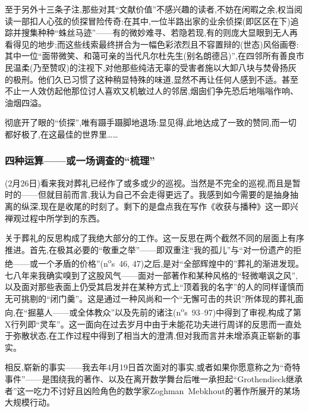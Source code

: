 至于另外十三条子注,那些对其“文献价值”不感兴趣的读者,不妨在闲暇之余,权当阅读一部扣人心弦的侦探冒险传奇:在其中,一位半路出家的业余侦探(即区区在下)追踪并搜集种种“蛛丝马迹”——有的微妙难寻、若隐若现,有的则庞大显眼到无人再看得见的地步;而这些线索最终拼合为一幅色彩浓烈且不容置辩的(世态)风俗画卷:其中一位“面带微笑、和蔼可亲的当代凡尔杜先生(别名朗德吕)”\dmark{},在四邻所有善良市民温柔(乃至赞叹)的注视下,对他那些纯洁无辜的受害者施以大卸八块与焚骨扬灰的极刑。他们久已习惯了这种稍显特殊的味道,显然不再让任何人感到不适。甚至不止一人效仿起他那位讨人喜欢又机敏过人的邻居,烟囱们争先恐后地嗡嗡作响、油烟四溢。

彻底开了眼的“侦探”,唯有蹑手蹑脚地退场:显见得,此地达成了一致的赞同,而一切都好极了,在这最佳的世界里……

\subsubsection*{四种运算——或一场调查的“梳理”}


(2月26日)看来我对葬礼已经作了或多或少的巡视。当然是不完全的巡视,而且是暂时的——但就目前而言,我认为自己不会走得更远了。我感到如今需要的是抽身抽离的纵深,现在是收尾的时刻了。剩下的是盘点我在写作《收获与播种》这一即兴禅观过程中所学到的东西。

关于葬礼的反思构成了我绝大部分的工作。这一反思在两个截然不同的层面上有序推进。首先,在极其必要的“敬重之举”——即双重注“我的孤儿”与“对一份遗产的拒绝——或一个矛盾的价格”(n\textsuperscript{o}s~46, 47)之后,是对“全部辉煌中的”葬礼的渐进发现。七八年来我确实嗅到了这股风气——面对一部著作和某种风格的“轻微嘲讽之风”,以及面对那些表面上仍受其启发并在某种方式上\dmark{}“顶着我的名字”的人的同样谨慎而无可挑剔的“闭门羹”。这是通过一种风尚和一个“无懈可击的共识”所体现的葬礼面向,在“掘墓人——或全体教众”以及先前的诸注(n\textsuperscript{o}s~93--97)中得到了审视,构成了第X行列即“灵车”。这一面向在过去岁月中由于未能花功夫进行周详的反思而一直处于弥散状态,在工作过程中得到了相当大的澄清,但对我而言并未增添真正崭新的事实。

相反,崭新的事实——我去年4月19日首次面对的事实,或者如果你愿意称之为“奇特事件”——是围绕我的著作、以及在离开数学舞台后唯一承担起“Grothendieck继承者”这一吃力不讨好且凶险角色的数学家Zoghman~Mebkhout的著作所展开的某场大规模行动。

